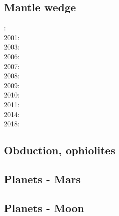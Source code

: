 \subsection*{Mantle wedge}

: \cite{tosl78}\\
2001: \cite{bigu01}\cite{haki01}\\
2003: \cite{vank03}\\
2006: \cite{gogc06}\cite{gecy06}\\
2007: \cite{gogc07}\cite{knvk07}\\
2008: \cite{knva08}\cite{cage08}\\
2009: \cite{leki09}\\
2010: \cite{roms10}\cite{hogz10}\\
2011: \cite{zhgh11}\\
2014: \cite{ledg14}\cite{mabv14}\\
2018: \cite{pltv18}

\subsection*{Obduction, ophiolites}
 

\noindent
\cite{hack90}
\cite{hack91}
\cite{agzf14}
\cite{duay15}

\subsection*{Planets - Mars}

\cite{scbg90}
\cite{nist01}
\cite{lenm04}
\cite{vavv05}
\cite{keta09}
\cite{gokg11}
\cite{ruts13}
\cite{seki14}
\cite{zhon16}

\subsection*{Planets - Moon}

\cite{zhdv19}

